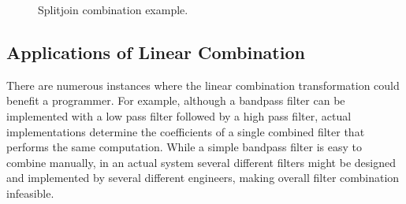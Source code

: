 \documentclass{sig-alternate}
\begin{document}
{\begin{figure}[t]
\center
\epsfxsize=2.089in
\vspace{-6pt}
\caption{Splitjoin combination example.}
\protect\label{fig:example-splitjoin-combination}
\vspace{-2pt}
\makeline
\vspace{-14pt}
\end{figure}


\subsection{Applications of Linear Combination}



There are numerous instances where the linear combination
transformation could benefit a programmer.  For example, although a
bandpass filter can be implemented with a low pass filter followed by
a high pass filter, actual implementations determine the
coefficients of a single combined filter that performs the same
computation. While a simple bandpass filter is easy to combine
manually, in an actual system several different filters might be
designed and implemented by several different engineers, making 
overall filter combination infeasible.

}
\end{document}
